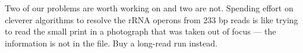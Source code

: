 \begin{plain}
Two of our problems are worth working on and two are not. Spending effort on cleverer algorithms to
resolve the rRNA operons from 233 bp reads is like trying to read the small print in a photograph
that was taken out of focus --- the information is not in the file. Buy a long-read run instead.
\end{plain}

